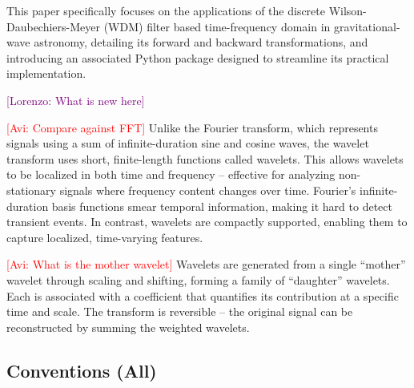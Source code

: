 \documentclass[%
 reprint,
superscriptaddress,
nofootinbib,
 amsmath,amssymb,
 aps,
colorlinks = true, 
linkcolor = blue, 
urlcolor = blue, 
citecolor = blue, 
anchorcolor = blue,
]{revtex4-2}
\newcommand{\ls}[1]{\textcolor{purple}{[Lorenzo: #1]}}
\newcommand{\avi}[1]{\textcolor{red}{[Avi: #1]}}
\begin{document}
This paper specifically focuses on the applications of the discrete Wilson-Daubechiers-Meyer (WDM) filter based time-frequency domain in gravitational-wave astronomy, detailing its forward and backward transformations, and introducing an associated Python package designed to streamline its practical implementation.

\ls{What is new here}


\avi{Compare against FFT}
Unlike the Fourier transform, which represents signals using a sum of infinite-duration sine and cosine waves, the wavelet transform uses short, finite-length functions called wavelets. 
This allows wavelets to be localized in both time and frequency -- effective for analyzing non-stationary signals where frequency content changes over time.  
Fourier's infinite-duration basis functions smear temporal information, making it hard to detect transient events. In contrast, wavelets are compactly supported, enabling them to capture localized, time-varying features.


\avi{What is the mother wavelet}
Wavelets are generated from a single ``mother'' wavelet through scaling and shifting, forming a family of ``daughter'' wavelets. 
Each is associated with a coefficient that quantifies its contribution at a specific time and scale. 
The transform is reversible -- the original signal can be reconstructed by summing the weighted wavelets.




\subsection{Conventions (All)}
\end{document}
